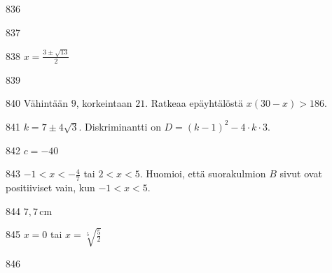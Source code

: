 \begin{Vastaus}{836}
    
\end{Vastaus}
\begin{Vastaus}{837}
    
\end{Vastaus}
\begin{Vastaus}{838}
    $x =\frac{3 \pm \sqrt{13}}{2}$
    
\end{Vastaus}
\begin{Vastaus}{839}
    
\end{Vastaus}
\begin{Vastaus}{840}
	Vähintään $9$, korkeintaan $21$. Ratkeaa epäyhtälöstä $x(30-x)>186$.
	
\end{Vastaus}
\begin{Vastaus}{841}
		$k = 7 \pm 4 \sqrt{3}$. Diskriminantti on $D = (k-1)^2-4\cdot k \cdot 3$.
    
\end{Vastaus}
\begin{Vastaus}{842}
		$c=-40$
    
\end{Vastaus}
\begin{Vastaus}{843}
	$-1 < x < -\frac{4}{7}$ tai $2 < x < 5$. Huomioi, että suorakulmion $B$
    sivut ovat positiiviset vain, kun $-1<x<5$.
    
\end{Vastaus}
\begin{Vastaus}{844}
     $7,7$\,cm
    
\end{Vastaus}
\begin{Vastaus}{845}
		$x=0$ tai $x=\sqrt[5]{\frac{5}{2}}$
    
\end{Vastaus}
\begin{Vastaus}{846}
    
\end{Vastaus}
